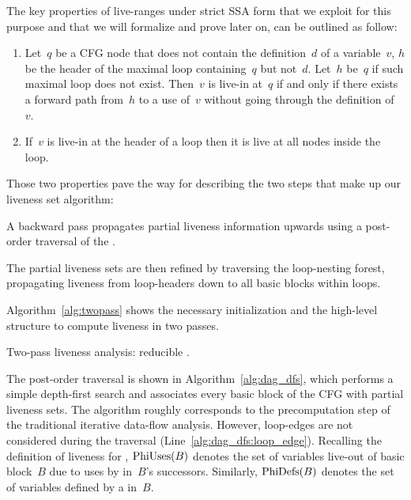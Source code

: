 The key properties of live-ranges under strict SSA form that we exploit for this purpose and that we will formalize and prove later on, can be outlined as follow:
\begin{enumerate}
\item
	Let~$q$ be a CFG node that does not contain the definition~$d$ of a variable~$v$, $h$ be the header of the maximal loop containing~$q$ but not~$d$.
	Let~$h$ be~$q$ if such maximal loop does not exist.
	Then~$v$ is live-in at~$q$ if and only if there exists a forward path from~$h$ to a use of~$v$ without going through the definition of~$v$.
\item
	If~$v$ is live-in at the header of a loop then it is live at all nodes inside the loop.
\end{enumerate}
Those two properties pave the way for describing the two steps that make up our liveness set algorithm:
\begin{compactenum}
\item
	A backward pass propagates partial liveness information upwards using a post-order traversal of the \@CFG.
\item
	The partial liveness sets are then refined by traversing the loop-nesting forest, propagating liveness from loop-headers down to all basic blocks within loops.
\end{compactenum}
Algorithm~\ref{alg:twopass} shows the necessary initialization and the high-level structure to compute liveness in two passes.

\begin{algorithm}[H]
    \caption{Two-pass liveness analysis: reducible \@CFG.}
  \label{alg:twopass}
\end{algorithm}

The post-order traversal is shown in Algorithm~\ref{alg:dag_dfs}, which performs a simple depth-first search and associates every basic block of the CFG with partial liveness sets.
The algorithm roughly corresponds to the precomputation step of the traditional iterative data-flow analysis.
However, loop-edges are not considered during the traversal (Line~\ref{alg:dag_dfs:loop_edge}).
Recalling the definition of liveness for \phifuns, $\textrm{PhiUses}(B)$ denotes the set of variables live-out of basic block~$B$ due to uses by \phifuns in~$B$'s successors.
Similarly, $\textrm{PhiDefs}(B)$ denotes the set of variables defined by a \phifun in~$B$.

